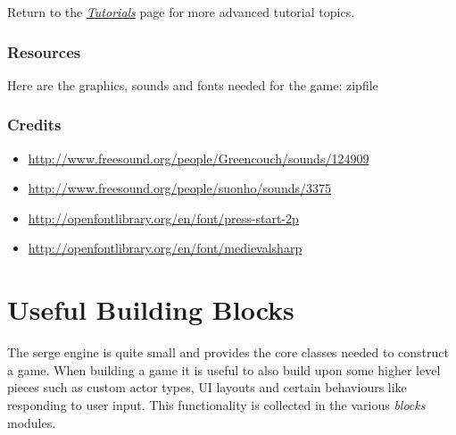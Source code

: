 \documentclass[letterpaper,10pt,english]{sphinxmanual}
\begin{document}
Return to the {\hyperref[tutorial::doc]{\emph{Tutorials}}} page for more advanced tutorial topics.


\subsection{Resources}
\label{tutorial-2:resources}
Here are the graphics, sounds and fonts needed for the game: zipfile


\subsection{Credits}
\label{tutorial-2:credits}\begin{itemize}
\item {} 
\href{http://www.freesound.org/people/Greencouch/sounds/124909}{http://www.freesound.org/people/Greencouch/sounds/124909}

\item {} 
\href{http://www.freesound.org/people/suonho/sounds/3375}{http://www.freesound.org/people/suonho/sounds/3375}

\item {} 
\href{http://openfontlibrary.org/en/font/press-start-2p}{http://openfontlibrary.org/en/font/press-start-2p}

\item {} 
\href{http://openfontlibrary.org/en/font/medievalsharp}{http://openfontlibrary.org/en/font/medievalsharp}

\end{itemize}


\chapter{Useful Building Blocks}
\label{usefulblocks:useful-building-blocks}\label{usefulblocks::doc}\label{usefulblocks:zipfile}
The serge engine is quite small and provides the core classes needed to construct a game. When building a game it is useful to also build upon some higher level pieces such as custom actor types, UI layouts and certain behaviours like responding to user input. This functionality is collected in the various \emph{blocks} modules.
\end{document}

